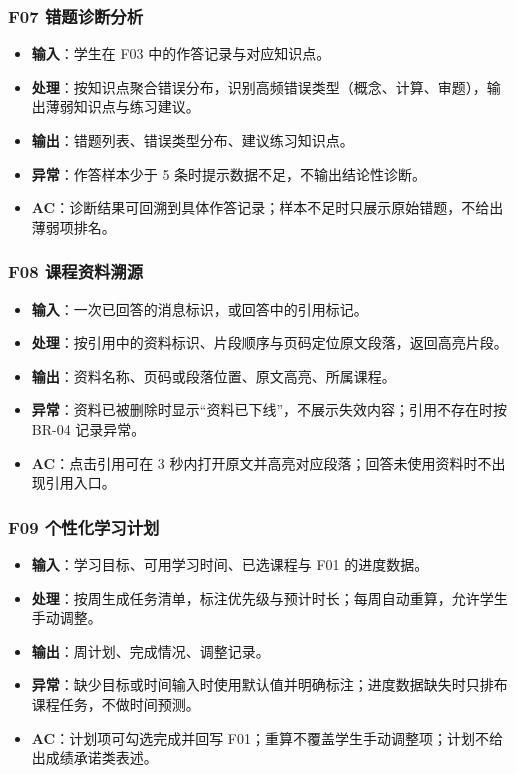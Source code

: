 \documentclass[12pt,a4paper]{ctexart}
\begin{document}
\subsubsection{F07 错题诊断分析}
\label{srs-f07}

\begin{itemize}
  \item \textbf{输入}：学生在 F03 中的作答记录与对应知识点。
  \item \textbf{处理}：按知识点聚合错误分布，识别高频错误类型（概念、计算、审题），输出薄弱知识点与练习建议。
  \item \textbf{输出}：错题列表、错误类型分布、建议练习知识点。
  \item \textbf{异常}：作答样本少于 5 条时提示数据不足，不输出结论性诊断。
  \item \textbf{AC}：诊断结果可回溯到具体作答记录；样本不足时只展示原始错题，不给出薄弱项排名。
\end{itemize}

\subsubsection{F08 课程资料溯源}
\label{srs-f08}

\begin{itemize}
  \item \textbf{输入}：一次已回答的消息标识，或回答中的引用标记。
  \item \textbf{处理}：按引用中的资料标识、片段顺序与页码定位原文段落，返回高亮片段。
  \item \textbf{输出}：资料名称、页码或段落位置、原文高亮、所属课程。
  \item \textbf{异常}：资料已被删除时显示“资料已下线”，不展示失效内容；引用不存在时按 BR-04 记录异常。
  \item \textbf{AC}：点击引用可在 3 秒内打开原文并高亮对应段落；回答未使用资料时不出现引用入口。
\end{itemize}

\subsubsection{F09 个性化学习计划}
\label{srs-f09}

\begin{itemize}
  \item \textbf{输入}：学习目标、可用学习时间、已选课程与 F01 的进度数据。
  \item \textbf{处理}：按周生成任务清单，标注优先级与预计时长；每周自动重算，允许学生手动调整。
  \item \textbf{输出}：周计划、完成情况、调整记录。
  \item \textbf{异常}：缺少目标或时间输入时使用默认值并明确标注；进度数据缺失时只排布课程任务，不做时间预测。
  \item \textbf{AC}：计划项可勾选完成并回写 F01；重算不覆盖学生手动调整项；计划不给出成绩承诺类表述。
\end{itemize}
\end{document}
